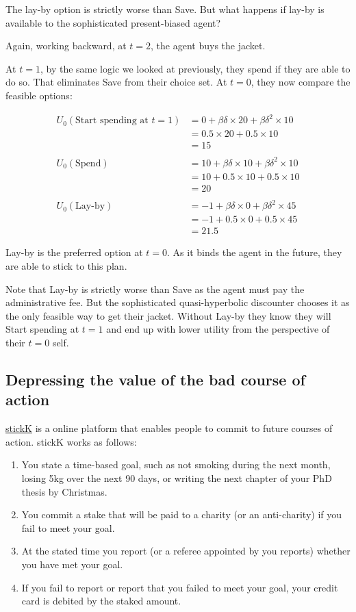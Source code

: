 \documentclass[
  letterpaper,
  DIV=11,
  numbers=noendperiod]{scrreprt}
\begin{document}
The lay-by option is strictly worse than Save. But what happens if
lay-by is available to the sophisticated present-biased agent?

Again, working backward, at \(t=2\), the agent buys the jacket.

At \(t=1\), by the same logic we looked at previously, they spend if
they are able to do so. That eliminates Save from their choice set. At
\(t=0\), they now compare the feasible options:

\begin{align*}
U_0(\text{Start spending at }t=1)&=0+\beta\delta \times 20+\beta\delta^2\times 10 \\
&=0.5\times 20+0.5\times 10 \\
&=15 \\
\\
U_0(\text{Spend})&=10+\beta\delta \times 10+\beta\delta^2\times 10 \\
&=10+0.5\times 10+0.5\times 10 \\
&=20 \\
\\
U_0(\text{Lay-by})&=-1+\beta\delta \times 0+\beta\delta^2\times 45 \\
&=-1+0.5\times 0+0.5\times 45 \\
&=21.5
\end{align*}

Lay-by is the preferred option at \(t=0\). As it binds the agent in the
future, they are able to stick to this plan.

Note that Lay-by is strictly worse than Save as the agent must pay the
administrative fee. But the sophisticated quasi-hyperbolic discounter
chooses it as the only feasible way to get their jacket. Without Lay-by
they know they will Start spending at \(t=1\) and end up with lower
utility from the perspective of their \(t=0\) self.

\hypertarget{depressing-the-value-of-the-bad-course-of-action}{%
\subsection{Depressing the value of the bad course of
action}\label{depressing-the-value-of-the-bad-course-of-action}}

\href{https://www.stickk.com}{stickK} is a online platform that enables
people to commit to future courses of action. stickK works as follows:

\begin{enumerate}
\def\labelenumi{\arabic{enumi}.}
\item
  You state a time-based goal, such as not smoking during the next
  month, losing 5kg over the next 90 days, or writing the next chapter
  of your PhD thesis by Christmas.
\item
  You commit a stake that will be paid to a charity (or an anti-charity)
  if you fail to meet your goal.
\item
  At the stated time you report (or a referee appointed by you reports)
  whether you have met your goal.
\item
  If you fail to report or report that you failed to meet your goal,
  your credit card is debited by the staked amount.
\end{enumerate}
\end{document}
